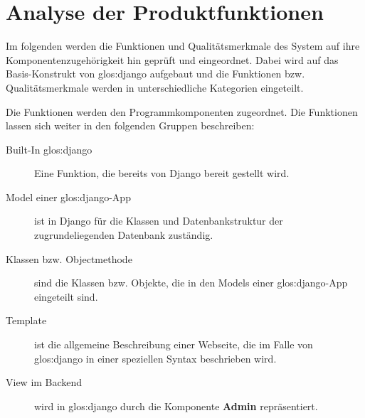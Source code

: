 \chapter{Analyse der Produktfunktionen}

%
%
Im folgenden werden die Funktionen und Qualitätsmerkmale des System auf ihre
Komponentenzugehörigkeit hin geprüft und eingeordnet. Dabei wird auf das
Basis-Konstrukt von \gls{glos:django} aufgebaut und die Funktionen bzw. Qualitätsmerkmale
werden in unterschiedliche Kategorien eingeteilt.

Die Funktionen werden den Programmkomponenten zugeordnet. Die Funktionen lassen
sich weiter in den folgenden Gruppen beschreiben:
\begin{description}
	\item[Built-In \gls{glos:django}] Eine Funktion, die bereits von Django bereit gestellt
	  wird.
	\item[Model einer \gls{glos:django}-App] ist in Django für die Klassen und
	  Datenbankstruktur der zugrundeliegenden Datenbank zuständig.
	\item[Klassen bzw. Objectmethode] sind die Klassen bzw. Objekte, die in den
	  Models einer \gls{glos:django}-App eingeteilt sind.
	\item[Template] ist die allgemeine Beschreibung einer Webseite, die im Falle
	  von \gls{glos:django} in einer speziellen Syntax beschrieben wird.
	\item[View im Backend] wird in \gls{glos:django} durch die Komponente \textbf{Admin}
	  repräsentiert.
\end{description}

